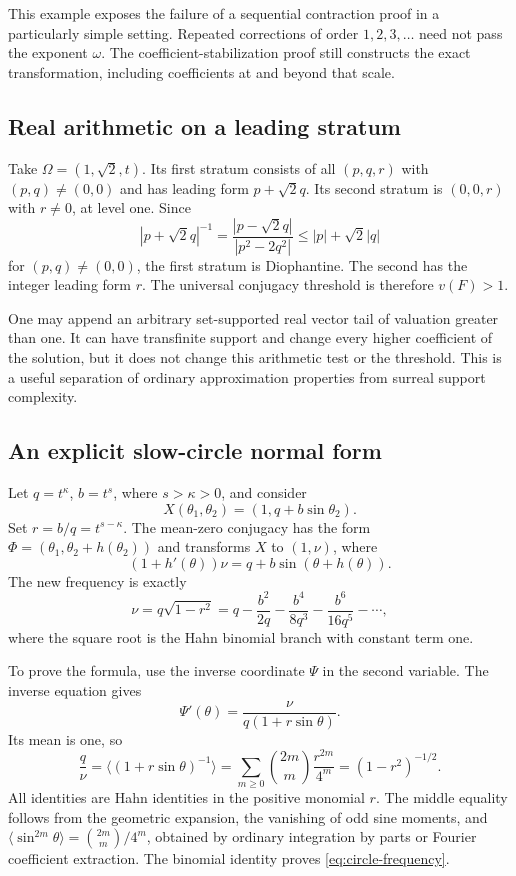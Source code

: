 \documentclass[11pt,letterpaper]{article}
\theoremstyle{definition}
\theoremstyle{remark}
\newcommand{\mean}[1]{\langle #1\rangle}
\numberwithin{equation}{section}
\begin{document}
This example exposes the failure of a sequential contraction proof in a
particularly simple setting.  Repeated corrections of order $1,2,3,\ldots$
need not pass the exponent $\omega$.  The coefficient-stabilization proof
still constructs the exact transformation, including coefficients at and
beyond that scale.

\subsection{Real arithmetic on a leading stratum}

Take $\Omega=(1,\sqrt2,t)$.  Its first stratum consists of all
$(p,q,r)$ with $(p,q)\ne(0,0)$ and has leading form $p+\sqrt2q$.
Its second stratum is $(0,0,r)$ with $r\ne0$, at level one.  Since
\[
 |p+\sqrt2q|^{-1}
 =\frac{|p-\sqrt2q|}{|p^2-2q^2|}
 \le |p|+\sqrt2|q|
\]
for $(p,q)\ne(0,0)$, the first stratum is Diophantine.  The second has the
integer leading form $r$.  The universal conjugacy threshold is therefore
$v(F)>1$.

One may append an arbitrary set-supported real vector tail of valuation
greater than one.  It can have transfinite support and change every higher
coefficient of the solution, but it does not change this arithmetic test or
the threshold.  This is a useful separation of ordinary approximation
properties from surreal support complexity.

\subsection{An explicit slow-circle normal form}

Let $q=t^\kappa$, $b=t^s$, where $s>\kappa>0$, and consider
\[
 X(\theta_1,\theta_2)=(1,q+b\sin\theta_2).
\]
Set $r=b/q=t^{s-\kappa}$.  The mean-zero conjugacy has the form
$\Phi=(\theta_1,\theta_2+h(\theta_2))$ and transforms $X$ to $(1,\nu)$,
where
\begin{equation}\label{eq:circle-conjugacy}
 (1+h'(\theta))\nu=q+b\sin(\theta+h(\theta)).
\end{equation}
The new frequency is exactly
\begin{equation}\label{eq:circle-frequency}
 \nu=q\sqrt{1-r^2}
 =q-\frac{b^2}{2q}-\frac{b^4}{8q^3}-\frac{b^6}{16q^5}-\cdots,
\end{equation}
where the square root is the Hahn binomial branch with constant term one.

To prove the formula, use the inverse coordinate $\Psi$ in the second
variable.  The inverse equation gives
\[
 \Psi'(\theta)=\frac{\nu}{q(1+r\sin\theta)}.
\]
Its mean is one, so
\[
 \frac q\nu=\mean{(1+r\sin\theta)^{-1}}
   =\sum_{m\ge0}\binom{2m}{m}\frac{r^{2m}}{4^m}
   =(1-r^2)^{-1/2}.
\]
All identities are Hahn identities in the positive monomial $r$.
The middle equality follows from the geometric expansion, the vanishing
of odd sine moments, and
$\mean{\sin^{2m}\theta}=\binom{2m}{m}/4^m$, obtained by ordinary integration
by parts or Fourier coefficient extraction.  The binomial identity proves
\eqref{eq:circle-frequency}.
\end{document}
